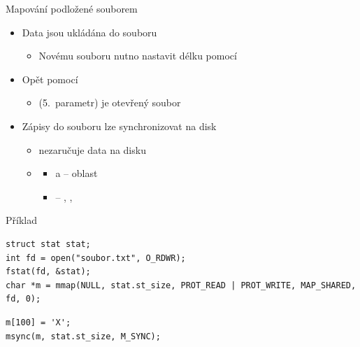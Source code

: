\begin{frame}[fragile]{Mapování podložené souborem}

  \begin{itemize}
    \item Data jsou ukládána do souboru
    \begin{itemize}
      \item Novému souboru nutno nastavit délku pomocí 
    \end{itemize}

    \pause

    \item Opět pomocí 
    \begin{itemize}
      \item {} (5.\ parametr) je otevřený soubor
    \end{itemize}

    \pause

    \item Zápisy do souboru lze synchronizovat na disk
    \begin{itemize}
      \item {} nezaručuje data na disku

      \pause

      \item {}
      \begin{itemize}
	\item {} a  -- oblast
	\item {} -- , ,
      \end{itemize}
    \end{itemize}
  \end{itemize}


  \begin{block}{Příklad}
  \begin{lstlisting}[belowskip=0pt]
struct stat stat;
int fd = open("soubor.txt", O_RDWR);
fstat(fd, &stat);
char *m = mmap(NULL, stat.st_size, PROT_READ | PROT_WRITE, MAP_SHARED, fd, 0);
  \end{lstlisting}
  \begin{lstlisting}[aboveskip=0pt]
m[100] = 'X';
msync(m, stat.st_size, M_SYNC);
  \end{lstlisting}
  \end{block}

\end{frame}

